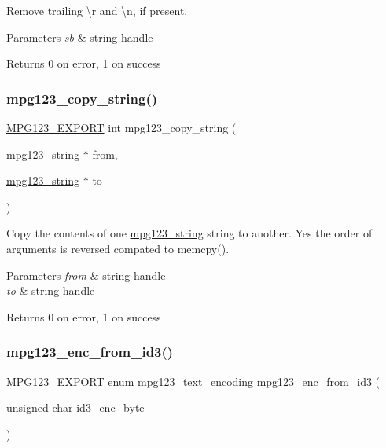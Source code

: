 Remove trailing \textbackslash{}r and \textbackslash{}n, if present. 
\begin{DoxyParams}{Parameters}
{\em sb} & string handle \\
\hline
\end{DoxyParams}
\begin{DoxyReturn}{Returns}
0 on error, 1 on success 
\end{DoxyReturn}
\mbox{\label{group__mpg123__metadata_ga9d7fe63da5bc665bc754975b293e0a6b}} 
\subsubsection{\texorpdfstring{mpg123\_copy\_string()}{mpg123\_copy\_string()}}
{\footnotesize\ttfamily \mbox{\hyperlink{mpg123_8h_a2ba98cfba3f760879df70e755b2a61cc}{M\+P\+G123\+\_\+\+E\+X\+P\+O\+RT}} int mpg123\+\_\+copy\+\_\+string (\begin{DoxyParamCaption}\item[{\mbox{\hyperlink{structmpg123__string}{mpg123\+\_\+string}} $\ast$}]{from,  }\item[{\mbox{\hyperlink{structmpg123__string}{mpg123\+\_\+string}} $\ast$}]{to }\end{DoxyParamCaption})}

Copy the contents of one \mbox{\hyperlink{structmpg123__string}{mpg123\+\_\+string}} string to another. Yes the order of arguments is reversed compated to memcpy(). 
\begin{DoxyParams}{Parameters}
{\em from} & string handle \\
\hline
{\em to} & string handle \\
\hline
\end{DoxyParams}
\begin{DoxyReturn}{Returns}
0 on error, 1 on success 
\end{DoxyReturn}
\mbox{\label{group__mpg123__metadata_gabd394947d8cca46e49a0e07926bb2369}} 
\subsubsection{\texorpdfstring{mpg123\_enc\_from\_id3()}{mpg123\_enc\_from\_id3()}}
{\footnotesize\ttfamily \mbox{\hyperlink{mpg123_8h_a2ba98cfba3f760879df70e755b2a61cc}{M\+P\+G123\+\_\+\+E\+X\+P\+O\+RT}} enum \mbox{\hyperlink{group__mpg123__metadata_ga489b4cd5fb8d1d826e38b09bed9294ce}{mpg123\+\_\+text\+\_\+encoding}} mpg123\+\_\+enc\+\_\+from\+\_\+id3 (\begin{DoxyParamCaption}\item[{unsigned char}]{id3\+\_\+enc\+\_\+byte }\end{DoxyParamCaption})}

